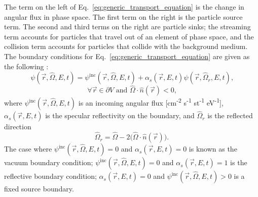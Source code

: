 The term on the left of Eq.~\ref{eq:generic_transport_equation} is the change in angular flux in phase space. The first term on the right is the particle source term. The second and third terms on the right are particle sinks; the streaming term accounts for particles that travel out of an element of phase space, and the collision term accounts for particles that collide with the background medium. The boundary conditions for Eq.~\ref{eq:generic_transport_equation} are given as the following \cite{computational_methods}:
\begin{equation}\label{eq:generic_transport_bc}
    \psi(\vec{r}, \hat{\Omega}, E, t) = \psi^{\text{inc}}(\vec{r}, \hat{\Omega}, E, t) + \alpha_{s}(\vec{r}, E, t)\psi(\vec{r}, \hat{\Omega}_{r}, E, t)\text{,}
\end{equation}
\begin{equation*}
    \forall \vec{r}\in\partial V \text{ and } \hat{\Omega}\cdot\hat{n}(\vec{r}) < 0\text{,}
\end{equation*}
where $\psi^{\text{inc}}(\vec{r}, \hat{\Omega}, E, t)$ is an incoming angular flux [cm\textsuperscript{-2} s\textsuperscript{-1} st\textsuperscript{-1} eV\textsuperscript{-1}], $\alpha_{s}(\vec{r}, E, t)$ is the specular reflectivity on the boundary, and $\hat{\Omega}_{r}$ is the reflected direction
\begin{equation}\label{eq:spec_direction}
    \hat{\Omega}_{r} = \hat{\Omega} - 2\Big(\hat{\Omega}\cdot\hat{n}(\vec{r})\Big)\text{.}
\end{equation}
The case where $\psi^{\text{inc}}(\vec{r}, \hat{\Omega}, E, t) = 0$ and $\alpha_{s}(\vec{r}, E, t) = 0$ is known as the vacuum boundary condition; $\psi^{\text{inc}}(\vec{r}, \hat{\Omega}, E, t) = 0$ and $\alpha_{s}(\vec{r}, E, t) = 1$ is the reflective boundary condition; $\alpha_{s}(\vec{r}, E, t) = 0$ and $\psi^{\text{inc}}(\vec{r}, \hat{\Omega}, E, t) > 0$ is a fixed source boundary.

